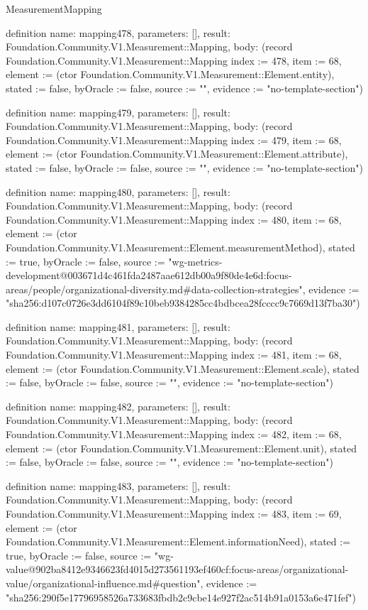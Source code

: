 \begin{lexlean}{MeasurementMapping}
\begin{semanticmodule}
definition{
  name: mapping478,
  parameters: [],
  result: Foundation.Community.V1.Measurement::Mapping,
  body: (record Foundation.Community.V1.Measurement::Mapping {index := 478, item := 68, element := (ctor Foundation.Community.V1.Measurement::Element.entity), stated := false, byOracle := false, source := "", evidence := "no-template-section"})
}

definition{
  name: mapping479,
  parameters: [],
  result: Foundation.Community.V1.Measurement::Mapping,
  body: (record Foundation.Community.V1.Measurement::Mapping {index := 479, item := 68, element := (ctor Foundation.Community.V1.Measurement::Element.attribute), stated := false, byOracle := false, source := "", evidence := "no-template-section"})
}

definition{
  name: mapping480,
  parameters: [],
  result: Foundation.Community.V1.Measurement::Mapping,
  body: (record Foundation.Community.V1.Measurement::Mapping {index := 480, item := 68, element := (ctor Foundation.Community.V1.Measurement::Element.measurementMethod), stated := true, byOracle := false, source := "wg-metrics-development@003671d4c461fda2487aae612db00a9f80de4e6d:focus-areas/people/organizational-diversity.md#data-collection-strategies", evidence := "sha256:d107c0726e3dd6104f89c10beb9384285cc4bdbcea28fcccc9c7669d13f7ba30"})
}

definition{
  name: mapping481,
  parameters: [],
  result: Foundation.Community.V1.Measurement::Mapping,
  body: (record Foundation.Community.V1.Measurement::Mapping {index := 481, item := 68, element := (ctor Foundation.Community.V1.Measurement::Element.scale), stated := false, byOracle := false, source := "", evidence := "no-template-section"})
}

definition{
  name: mapping482,
  parameters: [],
  result: Foundation.Community.V1.Measurement::Mapping,
  body: (record Foundation.Community.V1.Measurement::Mapping {index := 482, item := 68, element := (ctor Foundation.Community.V1.Measurement::Element.unit), stated := false, byOracle := false, source := "", evidence := "no-template-section"})
}

definition{
  name: mapping483,
  parameters: [],
  result: Foundation.Community.V1.Measurement::Mapping,
  body: (record Foundation.Community.V1.Measurement::Mapping {index := 483, item := 69, element := (ctor Foundation.Community.V1.Measurement::Element.informationNeed), stated := true, byOracle := false, source := "wg-value@902ba8412e9346623fd4015d273561193ef460cf:focus-areas/organizational-value/organizational-influence.md#question", evidence := "sha256:290f5e17796958526a733683fbdb2c9cbe14e927f2ac514b91a0153a6e471fef"})
}


\end{semanticmodule}
\end{lexlean}
